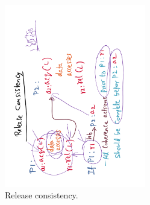 \documentclass[11pt]{lecture}
\def\fullsize{0.55\textwidth}
\begin{document}
\begin{figure}
\centering
\includegraphics[width=\fullsize,angle=-90]{Figures/rc}
\caption{Release consistency.}\label{fig: rc}
\end{figure}
\end{document}
